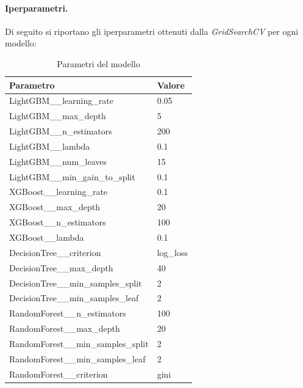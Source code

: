 \paragraph{Iperparametri.} Di seguito si riportano gli iperparametri ottenuti dalla \textit{GridSearchCV} per ogni modello:

\begin{table}[H]
    \centering
    \begin{tabular}{|l|l|}
    \toprule
    \textbf{Parametro}                 & \textbf{Valore} \\ \midrule
    LightGBM\_\_learning\_rate            & 0.05            \\ 
    LightGBM\_\_max\_depth                & 5               \\ 
    LightGBM\_\_n\_estimators             & 200             \\ 
    LightGBM\_\_lambda                    & 0.1             \\ 
    LightGBM\_\_num\_leaves               & 15              \\ 
    LightGBM\_\_min\_gain\_to\_split      & 0.1             \\ 
    XGBoost\_\_learning\_rate         & 0.1             \\ 
    XGBoost\_\_max\_depth             & 20              \\ 
    XGBoost\_\_n\_estimators          & 100             \\ 
    XGBoost\_\_lambda                 & 0.1             \\ 
    DecisionTree\_\_criterion         & log\_loss       \\ 
    DecisionTree\_\_max\_depth        & 40              \\ 
    DecisionTree\_\_min\_samples\_split & 2               \\ 
    DecisionTree\_\_min\_samples\_leaf & 2               \\ 
    RandomForest\_\_n\_estimators     & 100             \\ 
    RandomForest\_\_max\_depth        & 20              \\ 
    RandomForest\_\_min\_samples\_split & 2               \\ 
    RandomForest\_\_min\_samples\_leaf & 2               \\ 
    RandomForest\_\_criterion         & gini            \\ \bottomrule
    \end{tabular}
    \caption{Parametri del modello}
    
    \end{table}

